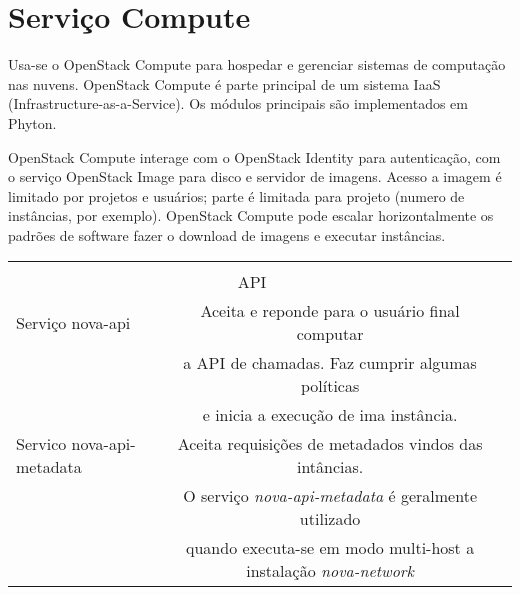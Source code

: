 \chapter{Serviço Compute}

Usa-se o OpenStack Compute para hospedar e gerenciar sistemas de computação nas nuvens. OpenStack Compute é parte principal de um sistema IaaS (Infrastructure-as-a-Service). Os módulos principais são implementados em Phyton.

OpenStack Compute interage com o OpenStack Identity para autenticação, com o serviço OpenStack Image para disco e servidor de imagens. Acesso a imagem é limitado por projetos e usuários; parte é limitada para projeto (numero de instâncias, por exemplo). OpenStack Compute pode escalar horizontalmente os padrões de software fazer o download de imagens e executar instâncias.

\begin{tabular}{|l||c|c|}
	\hline \\
	\multicolumn{2}{c}{API} \\
	\hline \hline 
	Serviço nova-api& Aceita e reponde para o usuário final computar\\& a API de chamadas. Faz cumprir algumas políticas\\& e inicia a execução de ima instância. \\
	\hline \hline
	Servico nova-api-metadata& Aceita requisições de metadados vindos das intâncias.\\& O serviço \emph{nova-api-metadata} é geralmente utilizado\\& quando executa-se em modo multi-host a instalação \emph{nova-network}\\
	\hline \hline
\end{tabular}

